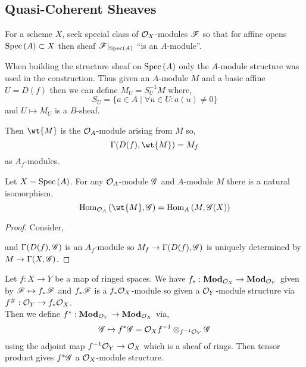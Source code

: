 \documentclass[12pt]{article}
\begin{document}
\subsection{Quasi-Coherent Sheaves}

For a scheme $X$, seek special class of $\mathcal{O}_{X}$-modules $\mathscr{F}$ so that for affine opens $\mathrm{Spec}\left( A \right) \subset X$ then sheaf $\mathscr{F}|_{\mathrm{Spec}\left( A \right)}$ ``is an $A$-module''. 

\begin{rmk}
When building the structure sheaf on $\mathrm{Spec}\left( A \right)$ only the $A$-module structure was used in the construction. Thus given an $A$-module $M$ and a basic affine $U = D(f)$ then we can define $M_U = S_U^{-1} M$ where,
\[ S_U = \{ a \in A \mid \forall u \in U : a(u) \neq 0 \} \]
and $U \mapsto M_U$ is a $B$-sheaf.
\end{rmk}

\begin{defn}
Then $\wt{M}$ is the $\mathcal{O}_{A}$-module arising from $M$ so,
\[ \Gamma(D(f), \wt{M}) = M_f \]
as $A_f$-modules.
\end{defn}

\begin{prop}
Let $X = \mathrm{Spec}\left( A \right)$. For any $\mathcal{O}_{A}$-module $\mathscr{G}$ and $A$-module $M$ there is a natural isomorphism,
\[ \Hom{\struct{A}}{\wt{M}}{\G} = \Hom{A}{M}{\G(X)} \]
\end{prop}

\begin{proof}
Consider,
\begin{center}
\end{center} 
and $\Gamma(D(f), \mathscr{G})$ is an $A_f$-module so $M_f \to \Gamma(D(f), \mathscr{G})$ is uniquely determined by $M \to \Gamma(X, \mathscr{G})$.
\end{proof}

\begin{defn}
Let $f : X \to Y$ be a map of ringed spaces. We have $f_* : \mathbf{Mod}_{\mathcal{O}_{X}} \to \mathbf{Mod}_{\mathcal{O}_{Y}}$ given by $\mathscr{F} \mapsto f_* \mathscr{F}$ and $f_* \mathscr{F}$ is a $f_* \mathcal{O}_{X}$-module so given a $\mathcal{O}_{Y}$-module structure via $f^\# : \mathcal{O}_{Y} \to f_* \mathcal{O}_{X}$.
\bigskip\\
Then we define $f^* : \mathbf{Mod}_{\mathcal{O}_{Y}} \to \mathbf{Mod}_{\mathcal{O}_{X}}$ via,
\[ \mathscr{G} \mapsto f^* \mathscr{G} = \mathcal{O}_{X}  f^{-1} \otimes_{f^{-1} \mathcal{O}_{Y}} \mathscr{G}  \]
using the adjoint map $f^{-1} \mathcal{O}_{Y} \to \mathcal{O}_{X}$ which is a sheaf of rings. Then tensor product gives $f^* \mathscr{G}$ a $\mathcal{O}_{X}$-module structure.
\end{defn}
\end{document}
